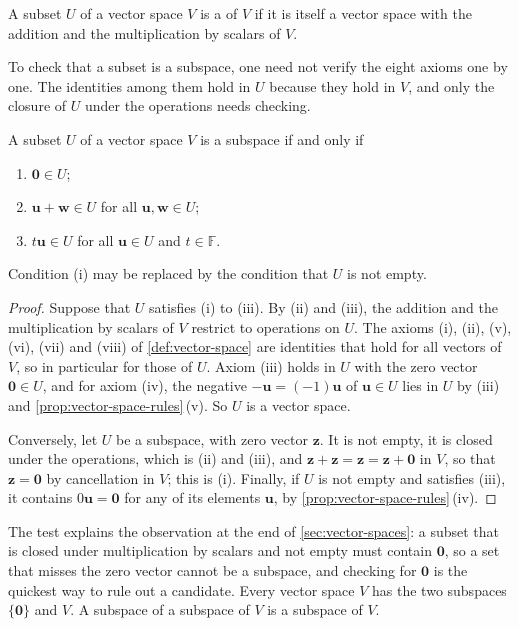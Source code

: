 \begin{definition}[Subspace]
\label{def:subspace}
A subset $U$ of a vector space $V$ is a  of $V$ if it is itself a vector space with the addition and the multiplication by scalars of $V$.
\end{definition}

To check that a subset is a subspace, one need not verify the eight axioms one by one. The identities among them hold in $U$ because they hold in $V$, and only the closure of $U$ under the operations needs checking.

\begin{theorem}
\label{thm:subspace-test}
A subset $U$ of a vector space $V$ is a subspace if and only if
\begin{enumerate}
\item $\mathbf 0\in U$;
\item $\mathbf u+\mathbf w\in U$ for all $\mathbf u,\mathbf w\in U$;
\item $t\mathbf u\in U$ for all $\mathbf u\in U$ and $t\in\mathbb F$.
\end{enumerate}
Condition (i) may be replaced by the condition that $U$ is not empty.
\end{theorem}

\begin{proof}
Suppose that $U$ satisfies (i) to (iii). By (ii) and (iii), the addition and the multiplication by scalars of $V$ restrict to operations on $U$. The axioms (i), (ii), (v), (vi), (vii) and (viii) of \cref{def:vector-space} are identities that hold for all vectors of $V$, so in particular for those of $U$. Axiom (iii) holds in $U$ with the zero vector $\mathbf 0\in U$, and for axiom (iv), the negative $-\mathbf u=(-1)\mathbf u$ of $\mathbf u\in U$ lies in $U$ by (iii) and \cref{prop:vector-space-rules}\,(v). So $U$ is a vector space.

Conversely, let $U$ be a subspace, with zero vector $\mathbf z$. It is not empty, it is closed under the operations, which is (ii) and (iii), and $\mathbf z+\mathbf z=\mathbf z=\mathbf z+\mathbf 0$ in $V$, so that $\mathbf z=\mathbf 0$ by cancellation in $V$; this is (i). Finally, if $U$ is not empty and satisfies (iii), it contains $0\mathbf u=\mathbf 0$ for any of its elements $\mathbf u$, by \cref{prop:vector-space-rules}\,(iv).
\end{proof}

The test explains the observation at the end of \cref{sec:vector-spaces}: a subset that is closed under multiplication by scalars and not empty must contain $\mathbf 0$, so a set that misses the zero vector cannot be a subspace, and checking for $\mathbf 0$ is the quickest way to rule out a candidate. Every vector space $V$ has the two  subspaces $\{\mathbf 0\}$ and $V$. A subspace of a subspace of $V$ is a subspace of $V$.

